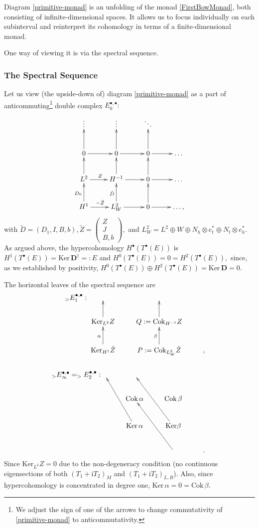 \documentclass[12pt]{article}
\theoremstyle{definition}
\theoremstyle{remark}
\numberwithin{theorem}{section}
\renewcommand{\i}{\mathrm{i}}
\begin{document}
Diagram \eqref{primitive-monad} is an unfolding of the monad \eqref{FirstBowMonad}, both consisting of infinite-dimensional spaces.  It allows us to focus individually on each subinterval and reinterpret its cohomology in terms of a finite-dimensional monad.  

One way of viewing it is via the spectral sequence.
\subsubsection{The Spectral Sequence}
Let us view (the upside-down of) diagram \eqref{primitive-monad}  as a part of anticommuting\footnote{We adjust the sign of one of the arrows to change commutativity of \eqref{primitive-monad} to anticommutativity.} double complex $E_0^{\bullet,\bullet}:$
$$
\xymatrix{
\vdots&\vdots&\ddots&\\
0\ar[u]\ar[r]&0\ar[u]\ar[r]&0\ar[u]\ar[r]&\hdots\\
L^2\ar[u]\ar[r]^Z&H^{-1}\ar[r]\ar[u]&0\ar[u]\ar[r]&\hdots\\
H^1\ar[u]^{D_0}\ar[r]^{-\tilde{Z}}&L^2_W\ar[u]^{\tilde{D}}\ar[r]&0\ar[u]\ar[r]&\hdots,
}
$$
with $\tilde{D}=(D_1,I,B,b), \tilde{Z}=
\begin{pmatrix}
Z\\J\\B,b
\end{pmatrix},$ and $L^2_W=L^2\oplus W\oplus N_h\otimes e_t^*\oplus N_t\otimes e_h^*.$  As  argued above, the hypercohomology $H^\bullet(T^\bullet(E))$ is $H^1(T^\bullet(E))=\mathrm{Ker}\, \mathbf{D}^\dagger=:E $ and $H^0(T^\bullet(E))=0=H^2(T^\bullet(E)),$ since, as we established by positivity, $H^0(T^\bullet(E))\oplus H^2(T^\bullet(E))=\mathrm{Ker}\,  \mathbf{D}=0.$

The horizontal leaves of the spectral sequence are 
\begin{align}
{
_>E_1^{\bullet,\bullet}:\xymatrix{
 & & \\
 \mathrm{Ker}_{L^2}Z\ar[u]&Q:=\mathrm{Cok}_{H^{-1}}Z\ar[u]\\
 \mathrm{Ker}_{H^1}\tilde{Z}\ar[u]^\alpha& P:=\mathrm{Cok}_{L^2_W}\tilde{Z}\ar[u]^\beta&,
 }
 }\\
\nonumber\\
{
_>E_\infty^{\bullet,\bullet}=_>E_2^{\bullet,\bullet}:\xymatrix{
& & & \\
& \mathrm{Cok}\, \alpha&\mathrm{Cok}\, \beta\\
& \mathrm{Ker}\, \alpha\ar[uul]& \mathrm{Ker} \beta\ar[uul]\\
 &&\ar[uul]&.
 }
 }
\end{align}
Since $\mathrm{Ker}_{L^2} Z=0$ due to the non-degeneracy condition (no continuous eigensections of both $(T_1+\i T_2)_M$ and $(T_1+\i T_2)_{L,R}$).  Also, since hypercohomology is concentrated in degree one, $\mathrm{Ker}\, \alpha=0=\mathrm{Cok}\,\beta.$
\end{document}
